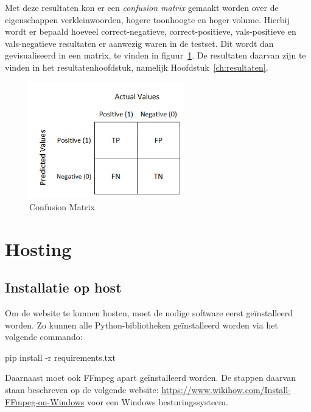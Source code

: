 Met deze resultaten kon er een \textit{confusion matrix} gemaakt worden over  de eigenschappen verkleinwoorden, hogere toonhoogte en hoger volume. Hierbij wordt er bepaald hoeveel correct-negatieve, correct-positieve, vals-positieve en vals-negatieve resultaten er aanwezig waren in de testset. Dit wordt dan gevisualiseerd in een matrix, te vinden in figuur~\ref{fig:confusion_matrix}. De resultaten daarvan zijn te vinden in het resultatenhoofdstuk, namelijk Hoofdstuk~\ref{ch:resultaten}.

\begin{figure}
    \centering
    \includegraphics[width=0.6\textwidth]{./img/confusion_matrix}
    \caption{\label{fig:confusion_matrix} Confusion Matrix~\autocite{Jain2020}}
\end{figure}

\section{Hosting}
\subsection{Installatie op host}
Om de website te kunnen hosten, moet de nodige software eerst geïnstalleerd worden. Zo kunnen alle Python-bibliotheken geïnstalleerd worden via het volgende commando:
\begin{python}
	pip install -r requirements.txt
\end{python}

Daarnaast moet ook FFmpeg apart geïnstalleerd worden. De stappen daarvan staan beschreven op de volgende website: \url{https://www.wikihow.com/Install-FFmpeg-on-Windows} voor een Windows besturingssysteem.

